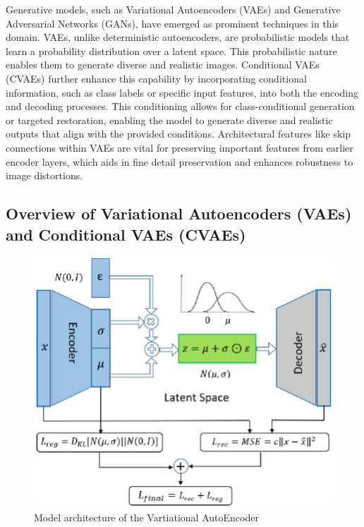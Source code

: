 \documentclass[conference]{IEEEtran}
\begin{document}
Generative models, such as Variational Autoencoders (VAEs) and Generative Adversarial Networks (GANs), have emerged as prominent techniques in this domain.\cite{Davis2020, Emuru2023, Bhunia2023, Ahmed2024} VAEs, unlike deterministic autoencoders, are probabilistic models that learn a probability distribution over a latent space. This probabilistic nature enables them to generate diverse and realistic images.\cite{Kumar2020} Conditional VAEs (CVAEs) further enhance this capability by incorporating conditional information, such as class labels or specific input features, into both the encoding and decoding processes. This conditioning allows for class-conditional generation or targeted restoration, enabling the model to generate diverse and realistic outputs that align with the provided conditions.\cite{Kumar2020, Graves2013} Architectural features like skip connections within VAEs are vital for preserving important features from earlier encoder layers, which aids in fine detail preservation and enhances robustness to image distortions.\cite{Emuru2023}

\subsection{Overview of Variational Autoencoders (VAEs) and Conditional VAEs (CVAEs)}
\justify

\begin{figure}[htbp]
    \centering
    \includegraphics[width=\columnwidth]{vae.png} %
    \caption{Model architecture of the Vartiational AutoEncoder}
    \label{fig:single_column_image}
\end{figure}
\end{document}
